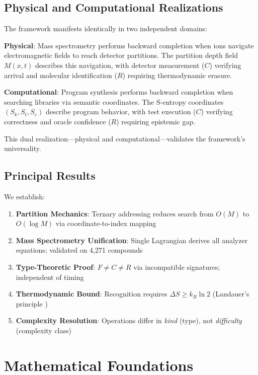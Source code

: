 \documentclass[twocolumn,aps,prl,superscriptaddress,floatfix]{revtex4-2}
\begin{document}
\subsection{Physical and Computational Realizations}

The framework manifests identically in two independent domains:

\textbf{Physical}: Mass spectrometry performs backward completion when ions navigate electromagnetic fields to reach detector partitions. The partition depth field $M(x,t)$ describes this navigation, with detector measurement ($C$) verifying arrival and molecular identification ($R$) requiring thermodynamic erasure.

\textbf{Computational}: Program synthesis performs backward completion when searching libraries via semantic coordinates. The S-entropy coordinates $(S_k, S_t, S_e)$ describe program behavior, with test execution ($C$) verifying correctness and oracle confidence ($R$) requiring epistemic gap.

This dual realization—physical and computational—validates the framework's universality.

\subsection{Principal Results}

We establish:

\begin{enumerate}
\item \textbf{Partition Mechanics}: Ternary addressing reduces search from $O(M)$ to $O(\log M)$ via coordinate-to-index mapping
\item \textbf{Mass Spectrometry Unification}: Single Lagrangian derives all analyzer equations; validated on 4,271 compounds
\item \textbf{Type-Theoretic Proof}: $F \neq C \neq R$ via incompatible signatures; independent of timing
\item \textbf{Thermodynamic Bound}: Recognition requires $\Delta S \geq k_B \ln 2$ (Landauer's principle \cite{Landauer1961})
\item \textbf{Complexity Resolution}: Operations differ in \emph{kind} (type), not \emph{difficulty} (complexity class)
\end{enumerate}

\section{Mathematical Foundations}
\end{document}
